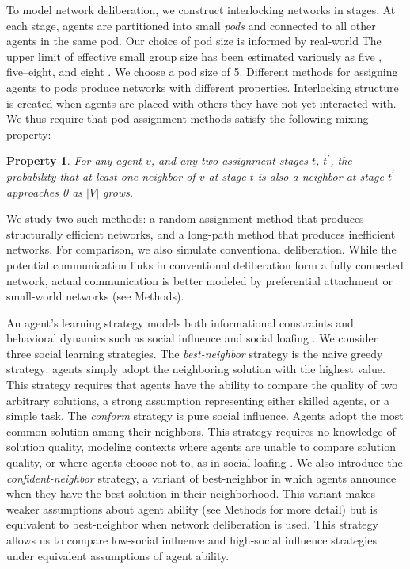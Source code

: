 \documentclass[twocolumn,10pt]{article}
\newtheorem{property}{Property}
\begin{document}
To model network deliberation, we construct interlocking networks in stages. At each stage, agents are partitioned into small {\em pods} and connected to all other agents in the same pod.
Our choice of pod size is informed by real-world The upper limit of effective small group size has been estimated variously as five \cite{freeman_tyranny_1972}, five--eight\cite{lohman_designing_2000}, and eight \cite{miflin_small_2004}.
We choose a pod size of 5.
Different methods for assigning agents to pods produce networks with different properties.
Interlocking structure is created when agents are placed with others they have not yet interacted with.
We thus require that pod assignment methods satisfy the following mixing property:
\begin{property}
\label{prop:mixing}
For any agent $v$, and any two assignment stages $t$, $t^\prime$, the probability that at least one neighbor of $v$ at stage $t$ is also a neighbor at stage $t^\prime$ approaches 0 as $|V|$ grows.
\end{property}
We study two such methods: a random assignment method that produces structurally efficient networks, and a long-path method that produces inefficient networks. For comparison, we also simulate conventional deliberation. While the potential communication links in conventional deliberation form a fully connected network, actual communication is better modeled by preferential attachment \cite{barabasi_emergence_1999} or small-world \cite{watts_collective_1998} networks (see Methods).

An agent's learning strategy models both informational constraints and behavioral dynamics \cite{lazer_network_2007, barkoczi_social_2016} such as social influence and social loafing \cite{karau_social_1993}.
We consider three social learning strategies.
The {\em best-neighbor} strategy is the naive greedy strategy: agents simply adopt the neighboring solution with the highest value. This strategy requires that agents have the ability to compare the quality of two arbitrary solutions, a strong assumption representing either skilled agents, or a simple task.
The {\em conform} strategy is pure social influence. Agents adopt the most common solution among their neighbors.
This strategy requires no knowledge of solution quality, modeling contexts where agents are unable to compare solution quality, or where agents choose not to, as in social loafing \cite{karau_social_1993}.
We also introduce the {\em confident-neighbor} strategy, a variant of best-neighbor in which agents announce when they have the best solution in their neighborhood. This variant makes weaker assumptions about agent ability (see Methods for more detail) but is equivalent to best-neighbor when network deliberation is used.
This strategy allows us to compare low-social influence and high-social influence strategies under equivalent assumptions of agent ability.
\end{document}
